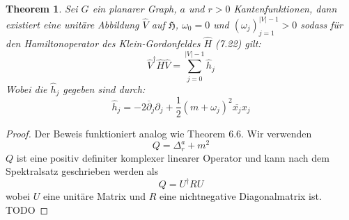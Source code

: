 \documentclass[11pt,a4paper,leqno]{report}
\newtheorem{theorem}{Theorem}[chapter]
\numberwithin{equation}{chapter}
\begin{document}
\noindent
\begin{theorem}
	Sei $G$ ein planarer Graph, $a$ und $r>0$ Kantenfunktionen, dann existiert eine unit\"are Abbildung $\hat{V}$ auf $\mathfrak{H}$, $\omega_0=0$ und $(\omega_j)_{j=1}^{|V|-1}>0$ sodass f\"ur den Hamiltonoperator des Klein-Gordonfeldes $\hat{H}$ (7.22) gilt:
	\begin{equation}
		\hat{V}^\dagger\hat{H}\hat{V}  = \sum_{j=0}^{|V|-1}\hat{h}_j
	\end{equation}
	Wobei die $\hat{h}_j$ gegeben sind durch:
	\begin{equation}
		\hat{h}_j= -2\overline{\partial}_j\partial_j + \frac{1}{2}(m + \omega_j)^2 \overline{x_j}x_j
	\end{equation}	
\end{theorem}
\begin{proof}
	Der Beweis funktioniert analog wie Theorem 6.6. Wir verwenden 
	\begin{equation*}
		Q= \Delta^{a}_r+ m^2
	\end{equation*}
$Q$ ist eine positiv definiter komplexer linearer Operator und kann nach dem Spektralsatz geschrieben werden als
	\begin{equation*}
	Q = U^\dagger R U
\end{equation*}
wobei $U$ eine unit\"are Matrix und $R$ eine nichtnegative Diagonalmatrix ist. TODO
\end{proof}
\end{document}
